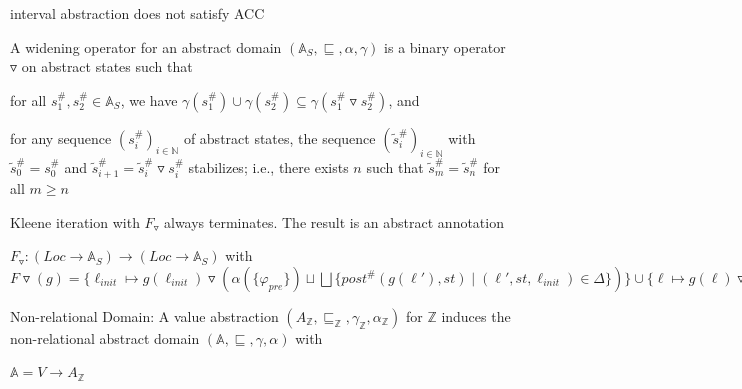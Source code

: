 \documentclass[landscape, a4paper]{article}
\begin{document}
\begin{minipage}[t]{0.2\linewidth}
	\begin{betterlist}
		\item {}
		\begin{betterlist}
			\item {}
			\item interval abstraction does not satisfy ACC
			\item \color{orange}A \alert{widening operator} for an abstract domain $(\mathbb{A}_S, \sqsubseteq, \alpha, \gamma)$ is a binary operator $\triangledown$ on abstract states such that\color{black}
			\begin{betterlist}
				\item for all $s^\#_1, s^\#_2 \in \mathbb{A}_S$, we have $\gamma(s^\#_1) \cup \gamma(s^\#_2) \subseteq \gamma(s^\#_1 \triangledown s^\#_2)$, and
				\item for any sequence $(s^\#_i)_{i\in \mathbb{N}}$ of abstract states, the sequence $(\tilde s^\#_i)_{i\in \mathbb{N}}$ with $\tilde s^\#_0 = s^\#_0$ and $\tilde s^\#_{i+1} = \tilde s^\#_i \triangledown s^\#_i$ stabilizes; i.e., there exists $n$ such that $\tilde s^\#_m = \tilde s^\#_n$ for all $m \ge n$
			\end{betterlist}
			\item Kleene iteration with $F_{\triangledown}$ always terminates. The result is an abstract annotation
			\begin{betterlist}
				\item $F_{\triangledown}: (Loc \rightarrow \mathbb{A}_S) \rightarrow (Loc \rightarrow \mathbb{A}_S)$ with $F\triangledown(g) = \{\ell_{init} \mapsto g(\ell_{init}) \triangledown(\alpha(\{\varphi_{pre}\}) \sqcup \bigsqcup \{post^\#(g(\ell'), st) \mid (\ell', st, \ell_{init}) \in \Delta\})\}\cup \{\ell\mapsto g(\ell) \triangledown \bigsqcup\{post^\#(g(\ell'), st) \mid (\ell', st, \ell) \in \Delta\} \mid \ell \in Loc \setminus \{\ell_{init}\}\}$
			\end{betterlist}
		\end{betterlist}
		\item \color{orange}\alert{Non-relational Domain:} A value abstraction $(A_{\mathbb{Z}}, \sqsubseteq_{\mathbb{Z}}, \gamma_{\mathbb{Z}}, \alpha_{\mathbb{Z}})$ for $\mathbb{Z}$ induces the \alert{non-relational abstract domain} $(\mathbb{A}, \sqsubseteq, \gamma, \alpha)$ with
		\begin{betterlist}
			\item $\mathbb{A} = V \rightarrow A_{\mathbb{Z}}$

\end{betterlist}
\end{betterlist}
\end{minipage}
\end{document}

